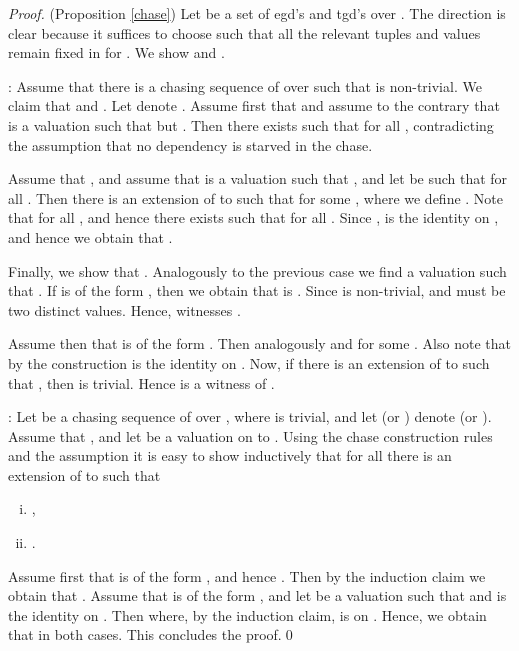 \documentclass[envcountset]{llncs}
\begin{document}
\begin{proof}(Proposition \ref{chase})
Let  be a set of egd's and tgd's over . The direction 
 is clear because it suffices to choose  such that all the relevant tuples and values remain fixed in  for . We show  and .

: Assume that there is a chasing sequence  of  over  such that   is non-trivial. We claim that  and . Let   denote . Assume first that  and assume to the contrary that  is a valuation such that  but . Then there exists  such that   for all , contradicting the assumption that no dependency is starved in the chase. 

Assume that , and assume that  is a valuation such that , and let  be such that   for all . Then there is an extension  of  to  such that  for some , where we define . Note that   for all , and  hence there exists  such that  for all .
Since ,   is the identity on , and hence we obtain that .

Finally, we show that . Analogously to the previous case we find a valuation  such that . If  is of the form , then we obtain that  is . Since  is non-trivial,  and  must  be two distinct values. Hence,   witnesses . 

Assume then that  is of the form . Then analogously   and  for some . Also note that by the construction  is the identity on . Now, if there is an extension  of  to  such that , then  is trivial. Hence  is a witness of .

: Let  be a chasing sequence of  over , where  is trivial, and let  (or ) denote  (or ). Assume that , and let  be a valuation on  to .  Using the chase construction rules and the assumption it is easy to show  inductively that for all  there is an extension  of  to  such that 
\begin{enumerate}[(i)]
\item ,
\item  .
\end{enumerate} Assume first that  is of the form , and hence . Then by the induction claim we obtain that . Assume that  is of the form , and let  be a valuation such that  and  is the identity on . Then  where, by the induction claim,  is  on . Hence, we obtain that  in both cases. This concludes the proof.\qed



\end{proof}
\end{document}
